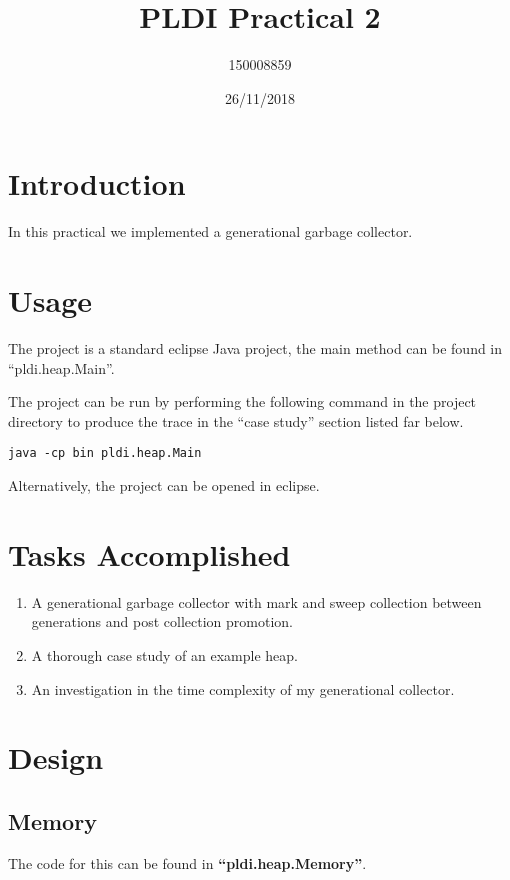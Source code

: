 \documentclass{article}
\title{PLDI Practical 2}
\date{26/11/2018}
\author{150008859}
\begin{document}
\maketitle
\newpage

\section{Introduction}

In this practical we implemented a generational garbage collector.

\section{Usage}

The project is a standard eclipse Java project, the main method can be found in ``pldi.heap.Main''.

The project can be run by performing the following command in the project directory to produce the trace in the ``case study'' section listed far below.

\begin{verbatim}
java -cp bin pldi.heap.Main
\end{verbatim}

Alternatively, the project can be opened in eclipse.

\section{Tasks Accomplished}

\begin{enumerate}
\item A generational garbage collector with mark and sweep collection between generations and post collection promotion.
\item A thorough case study of an example heap. 
\item An investigation in the time complexity of my generational collector.
\end{enumerate}

\section{Design}

\subsection{Memory}

The code for this can be found in \textbf{``pldi.heap.Memory''}.
\end{document}

